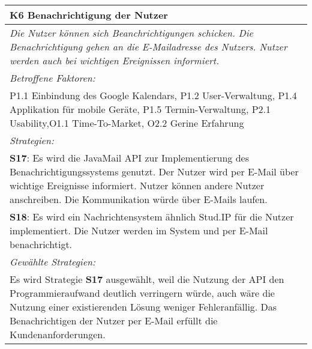 {%
\begin{center}
\begin{minipage}{\linewidth}
    \centering
\renewcommand{\arraystretch}{1.5}
\begin{tabular}{|>{\centering\arraybackslash}p{15cm}|}
            \hline
           \textbf{K6 Benachrichtigung der Nutzer}\\ \hline
            \label{K6}
            \textit{Die Nutzer können sich Beanchrichtigungen schicken. Die Benachrichtigung gehen an die E-Mailadresse des Nutzers. Nutzer werden auch bei wichtigen Ereignissen informiert.}\\ \hline
            \textit{Betroffene Faktoren:} \\ 
	P1.1 Einbindung des Google Kalendars, P1.2 User-Verwaltung, P1.4 Applikation für mobile Geräte, P1.5 Termin-Verwaltung, P2.1 Usability,O1.1 Time-To-Market, O2.2 Gerine Erfahrung
\\ \hline
	      \textit{Strategien:} \\
	\textbf{S17}: Es wird die JavaMail API zur Implementierung des Benachrichtigungssystems genutzt. Der Nutzer wird per E-Mail über wichtige Ereignisse informiert. Nutzer können andere Nutzer anschreiben. Die Kommunikation würde über E-Mails laufen. \\
	\textbf{S18}:  Es wird ein Nachrichtensystem ähnlich Stud.IP für die Nutzer implementiert. Die Nutzer werden im System und per E-Mail benachrichtigt. 
\\ \hline
	      \textit{Gewählte Strategien:} \\ 
Es wird Strategie \textbf{S17} ausgewählt, weil die Nutzung der API den Programmieraufwand deutlich verringern würde, auch wäre die Nutzung einer existierenden Lösung weniger Fehleranfällig. Das Benachrichtigen der Nutzer per E-Mail erfüllt die Kundenanforderungen. 
\\ \hline
        \end{tabular}
\end{minipage}
\end{center}

}
